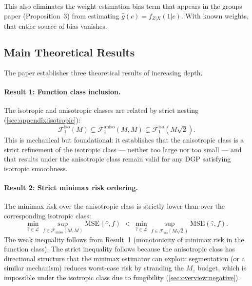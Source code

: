 This also eliminates the weight estimation bias term that appears in the groups paper (Proposition~3) from estimating $\hat{g}(c) = f_{Z|X}(1|c)$.
With known weights, that entire source of bias vanishes.


\subsection{Main Theoretical Results}\label{sec:overview:results}

The paper establishes three theoretical results of increasing depth.

\paragraph{Result 1: Function class inclusion.}
The isotropic and anisotropic classes are related by strict nesting (\cref{sec:appendix:isotropic}):
\begin{equation*}
	\mathcal{F}_1^{\mathrm{iso}}(M) \subsetneq \mathcal{F}_1^{\mathrm{aniso}}(M, M) \subsetneq \mathcal{F}_1^{\mathrm{iso}}(M\sqrt{2}).
\end{equation*}
This is mechanical but foundational: it establishes that the anisotropic class is a strict refinement of the isotropic class --- neither too large nor too small --- and that results under the anisotropic class remain valid for any DGP satisfying isotropic smoothness.

\paragraph{Result 2: Strict minimax risk ordering.}
The minimax risk over the anisotropic class is strictly lower than over the corresponding isotropic class:
\begin{equation*}
	\min_{\hat\tau \in \mathcal{L}} \sup_{f \in \mathcal{F}_{\mathrm{aniso}}(M, M)} \mathrm{MSE}(\hat\tau, f) \;<\; \min_{\hat\tau \in \mathcal{L}} \sup_{f \in \mathcal{F}_{\mathrm{iso}}(M\sqrt{2})} \mathrm{MSE}(\hat\tau, f).
\end{equation*}
The weak inequality follows from Result~1 (monotonicity of minimax risk in the function class).
The strict inequality follows because the anisotropic class has directional structure that the minimax estimator can exploit: segmentation (or a similar mechanism) reduces worst-case risk by stranding the $M_z$ budget, which is impossible under the isotropic class due to fungibility (\cref{sec:overview:negative}).

